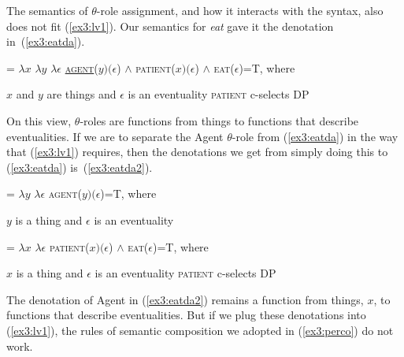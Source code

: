 The semantics of $\theta$-role assignment, and how it interacts with the syntax, also does not fit (\ref{ex3:lv1}). Our semantics for \emph{eat} gave it the denotation in~(\ref{ex3:eatda}).
\begin{exe}
	\raggedright
	\ex \label{ex3:eatda} 
	 = $\lambda x$ $\lambda y$ $\lambda \epsilon$ \textsc{\underline{agent}}($y)(\epsilon$) $\wedge$ \textsc{patient}($x)(\epsilon$) $\wedge$ \textsc{eat}($\epsilon$)=T, where
	\begin{xlist}
	\ex $x$ and $y$ are things and $\epsilon$ is an eventuality
	\ex \textsc{patient} c-selects DP
	\end{xlist}
\end{exe}
On this view, $\theta$-roles are functions from things to functions that describe eventualities. If we are to separate the Agent $\theta$-role from (\ref{ex3:eatda}) in the way that (\ref{ex3:lv1}) requires, then the denotations we get from simply doing this to (\ref{ex3:eatda}) is~(\ref{ex3:eatda2}).
\begin{exe}
	\raggedright
	\ex \label{ex3:eatda2} 
	\begin{xlist}
		\ex {} = $\lambda y$ $\lambda \epsilon$ \textsc{agent}($y)(\epsilon$)=T, where
		\begin{xlist}
		\ex $y$ is a thing and $\epsilon$ is an eventuality
		\end{xlist}
		\ex {} = $\lambda x$ $\lambda \epsilon$ \textsc{patient}($x)(\epsilon$) $\wedge$ \textsc{eat}($\epsilon$)=T, where
		\begin{xlist}
		\ex $x$ is a thing and $\epsilon$ is an eventuality
		\ex \textsc{patient} c-selects DP
		\end{xlist}
	\end{xlist}
\end{exe}
The denotation of Agent in (\ref{ex3:eatda2}) remains a function from things, $x$, to functions that describe eventualities. But if we plug these denotations into (\ref{ex3:lv1}), the rules of semantic composition we adopted in (\ref{ex3:perco}) do not work.
